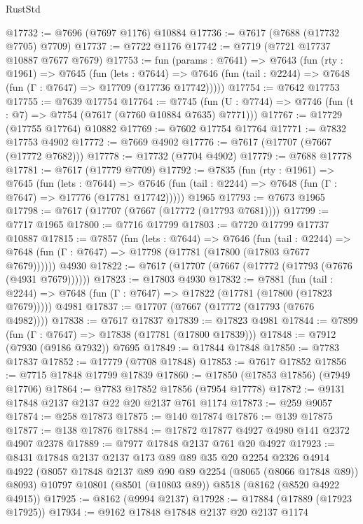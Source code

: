 \begin{lexlean}{RustStd}
\begin{coremodule}
@17732 := @7696 (@7697 @1176) @10884
@17736 := @7617 (@7688 (@17732 @7705) @7709)
@17737 := @7722 @1176
@17742 := @7719 (@7721 @17737 @10887 @7677 @7679)
@17753 := fun (params : @7641) =>
  @7643
    (fun (rty : @1961) =>
    @7645
      (fun (lets : @7644) =>
      @7646 (fun (tail : @2244) => @7648 (fun (Γ : @7647) => @17709 (@17736 @17742)))))
@17754 := @7642 @17753
@17755 := @7639 @17754
@17764 := @7745
    (fun (U : @7744) => @7746 (fun (t : @7) => @7754 (@7617 (@7760 @10884 @7635) @7771)))
@17767 := @17729 (@17755 @17764) @10882
@17769 := @7602 @17754 @17764
@17771 := @7832 @17753 @4902
@17772 := @7669 @4902
@17776 := @7617 (@17707 (@7667 (@17772 @7682)))
@17778 := @17732 (@7704 @4902)
@17779 := @7688 @17778
@17781 := @7617 (@17779 @7709)
@17792 := @7835
    (fun (rty : @1961) =>
    @7645
      (fun (lets : @7644) =>
      @7646 (fun (tail : @2244) => @7648 (fun (Γ : @7647) => @17776 (@17781 @17742)))))
    @1965
@17793 := @7673 @1965
@17798 := @7617 (@17707 (@7667 (@17772 (@17793 @7681))))
@17799 := @7717 @1965
@17800 := @7716 @17799
@17803 := @7720 @17799 @17737 @10887
@17815 := @7857
    (fun (lets : @7644) =>
    @7646
      (fun (tail : @2244) =>
      @7648 (fun (Γ : @7647) => @17798 (@17781 (@17800 (@17803 @7677 @7679))))))
    @4930
@17822 := @7617 (@17707 (@7667 (@17772 (@17793 (@7676 (@4931 @7679))))))
@17823 := @17803 @4930
@17832 := @7881
    (fun (tail : @2244) => @7648 (fun (Γ : @7647) => @17822 (@17781 (@17800 (@17823 @7679)))))
    @4981
@17837 := @17707 (@7667 (@17772 (@17793 (@7676 @4982))))
@17838 := @7617 @17837
@17839 := @17823 @4981
@17844 := @7899 (fun (Γ : @7647) => @17838 (@17781 (@17800 @17839)))
@17848 := @7912 (@7930 (@9186 @7932)) @7695
@17849 := @17844 @17848
@17850 := @7783 @17837
@17852 := @17779 (@7708 @17848)
@17853 := @7617 @17852
@17856 := @7715 @17848 @17799 @17839
@17860 := @17850 (@17853 @17856) (@7949 @17706)
@17864 := @7783 @17852 @17856 (@7954 @17778)
@17872 := @9131 @17848 @2137 @2137 @22 @20 @2137 @761 @1174
@17873 := @259 @9057
@17874 := @258 @17873
@17875 := @140 @17874
@17876 := @139 @17875
@17877 := @138 @17876
@17884 := @17872 @17877 @4927 @4980 @141 @2372 @4907 @2378
@17889 := @7977 @17848 @2137 @761 @20 @4927
@17923 := @8431
    @17848
    @2137
    @2137
    @173
    @89
    @89
    @35
    @20
    @2254
    @2326
    @4914
    @4922
    (@8057 @17848 @2137 @89 @90 @89 @2254 (@8065 (@8066 @17848 @89)) @8093)
    @10797
    @10801
    (@8501 (@10803 @89))
    @8518
    (@8162 (@8520 @4922 @4915))
@17925 := @8162 (@9994 @2137)
@17928 := @17884 (@17889 (@17923 @17925))
@17934 := @9162 @17848 @17848 @2137 @20 @2137 @1174

\end{coremodule}
\end{lexlean}

